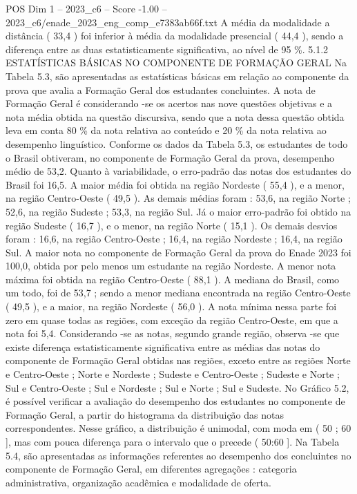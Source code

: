 \begin{textsample}{POS Dim 1 – 2023\_c6 – Score -1.00 – 2023\_c6/enade\_2023\_eng\_comp\_e7383ab66f.txt}
A média da modalidade a distância ( 33,4 ) foi inferior à média da modalidade presencial ( 44,4 ), sendo a diferença entre as duas estatisticamente significativa, ao nível de 95 \%. 5.1.2 ESTATÍSTICAS BÁSICAS NO COMPONENTE DE FORMAÇÃO GERAL Na Tabela 5.3, são apresentadas as estatísticas básicas em relação ao componente da prova que avalia a Formação Geral dos estudantes concluintes.
A nota de Formação Geral é considerando -se os acertos nas nove questões objetivas e a nota média obtida na questão discursiva, sendo que a nota dessa questão obtida leva em conta 80 \% da nota relativa ao conteúdo e 20 \% da nota relativa ao desempenho linguístico.
Conforme os dados da Tabela 5.3, os estudantes de todo o Brasil obtiveram, no componente de Formação Geral da prova, desempenho médio de 53,2.
Quanto à variabilidade, o erro-padrão das notas dos estudantes do Brasil foi 16,5.
A maior média foi obtida na região Nordeste ( 55,4 ), e a menor, na região Centro-Oeste ( 49,5 ).
As demais médias foram : 53,6, na região Norte ; 52,6, na região Sudeste ; 53,3, na região Sul.
Já o maior erro-padrão foi obtido na região Sudeste ( 16,7 ), e o menor, na região Norte ( 15,1 ).
Os demais desvios foram : 16,6, na região Centro-Oeste ; 16,4, na região Nordeste ; 16,4, na região Sul.
A maior nota no componente de Formação Geral da prova do Enade 2023 foi 100,0, obtida por pelo menos um estudante na região Nordeste.
A menor nota máxima foi obtida na região Centro-Oeste ( 88,1 ).
A mediana do Brasil, como um todo, foi de 53,7 ; sendo a menor mediana encontrada na região Centro-Oeste ( 49,5 ), e a maior, na região Nordeste ( 56,0 ).
A nota mínima nessa parte foi zero em quase todas as regiões, com exceção da região Centro-Oeste, em que a nota foi 5,4.
Considerando -se as notas, segundo grande região, observa -se que existe diferença estatisticamente significativa entre as médias das notas do componente de Formação Geral obtidas nas regiões, exceto entre as regiões Norte e Centro-Oeste ; Norte e Nordeste ; Sudeste e Centro-Oeste ; Sudeste e Norte ; Sul e Centro-Oeste ; Sul e Nordeste ; Sul e Norte ; Sul e Sudeste.
No Gráfico 5.2, é possível verificar a avaliação do desempenho dos estudantes no componente de Formação Geral, a partir do histograma da distribuição das notas correspondentes.
Nesse gráfico, a distribuição é unimodal, com moda em ( 50 ; 60 ], mas com pouca diferença para o intervalo que o precede ( 50:60 ].
Na Tabela 5.4, são apresentadas as informações referentes ao desempenho dos concluintes no componente de Formação Geral, em diferentes agregações : categoria administrativa, organização acadêmica e modalidade de oferta.

\end{textsample}
